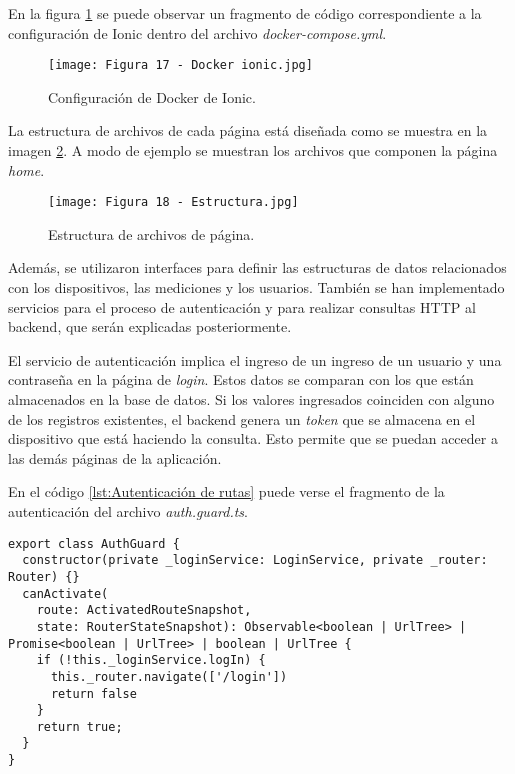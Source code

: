 En la figura \ref{fig:17} se puede observar un fragmento de código correspondiente a la configuración de Ionic dentro del archivo \textit{docker-compose.yml}.

\begin{figure}[h]
\centering
\texttt{[image: Figura 17 - Docker ionic.jpg]}
\caption[Configuración de Docker de Ionic]{Configuración de Docker de Ionic.}
\label{fig:17}
\end{figure}

La estructura de archivos de cada página está diseñada como se muestra en la imagen \ref{fig:18}. A modo de ejemplo se muestran los archivos que componen la página \textit{home}.

\newpage
\begin{figure}[h]
\centering
\texttt{[image: Figura 18 - Estructura.jpg]}
\caption[Estructura de archivos de página]{Estructura de archivos de página.}
\label{fig:18}
\end{figure}

Además, se utilizaron interfaces para definir las estructuras de datos relacionados con los dispositivos, las mediciones y los usuarios. También se han implementado servicios para el proceso de autenticación y para realizar consultas HTTP al backend, que serán explicadas posteriormente.

El servicio de autenticación implica el ingreso de un ingreso de un usuario y una contraseña en la página de \textit{login}. Estos datos se comparan con los que están almacenados en la base de datos. Si los valores ingresados coinciden con alguno de los registros existentes, el backend genera un \textit{token} que se almacena en el dispositivo que está haciendo la consulta. Esto permite que se puedan acceder a las demás páginas de la aplicación.

En el código \ref{lst:Autenticación de rutas} puede verse el fragmento de la autenticación del archivo \textit{auth.guard.ts}.



\begin{lstlisting}[caption={Autenticación de rutas.}, label={lst:Autenticación de rutas}]
export class AuthGuard {
  constructor(private _loginService: LoginService, private _router: Router) {}
  canActivate(
    route: ActivatedRouteSnapshot,
    state: RouterStateSnapshot): Observable<boolean | UrlTree> | Promise<boolean | UrlTree> | boolean | UrlTree {
    if (!this._loginService.logIn) {
      this._router.navigate(['/login'])
      return false
    }
    return true;
  }
}
\end{lstlisting}

